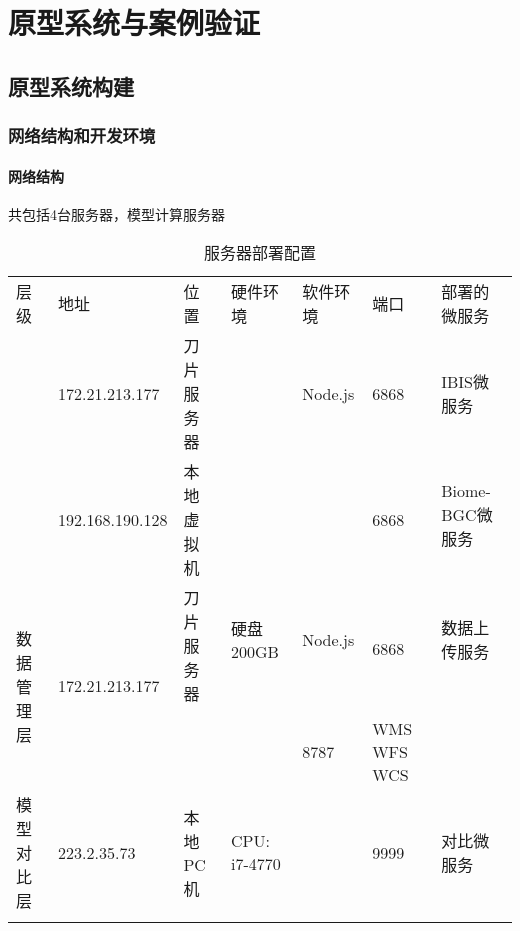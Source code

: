 \chapter{原型系统与案例验证}

\section{原型系统构建}
\subsection{网络结构和开发环境}
\subsubsection{网络结构}
共包括4台服务器，模型计算服务器

\begin{table}[H]
    \centering
    \caption{服务器部署配置}
    \label{tab:data-format-feature}
    \begin{threeparttable}
        \begin{tabular}{lllllll}
            \Xhline{1.5pt}
            层级 & 地址 & 位置 & 硬件环境 & 软件环境 & 端口 & 部署的微服务 \\
            \Xhline{1pt}
            \multirow{3}{*}{模型计算层} & 172.21.213.177 & 刀片服务器 &  & Node.js & 6868 & IBIS微服务 \\
            \cline{2-4}
            & \multirow{2}{*}{192.168.190.128} & \multirow{2}{*}{本地虚拟机} & \multirow{2}{*}{} & \multirow{2}{*}{} & \multirow{2}{*}{6868} & Biome-BGC微服务 \\
            \cline{4-4}
            &&&&& LPJ微服务 \\
            \hline
            \multirow{4}{*}{数据管理层} & \multirow{4}{*}{172.21.213.177} & \multirow{2}{*}{刀片服务器} & 硬盘200GB & Node.js & \multirow{3}{*}{6868} & 数据上传服务 \\
            \cline{4-4}
            &&&&& 数据下载服务 \\
            \cline{4-4}
            &&&&& 数据重构服务 \\
            \cline{3-4}
            & & & & 8787 & WMS WFS WCS \\
            \hline
            模型对比层 & 223.2.35.73 & 本地PC机 & CPU: i7-4770 & & 9999 & 对比微服务 \\
            \Xhline{1.5pt}
        \end{tabular}
    \end{threeparttable}
\end{table}

